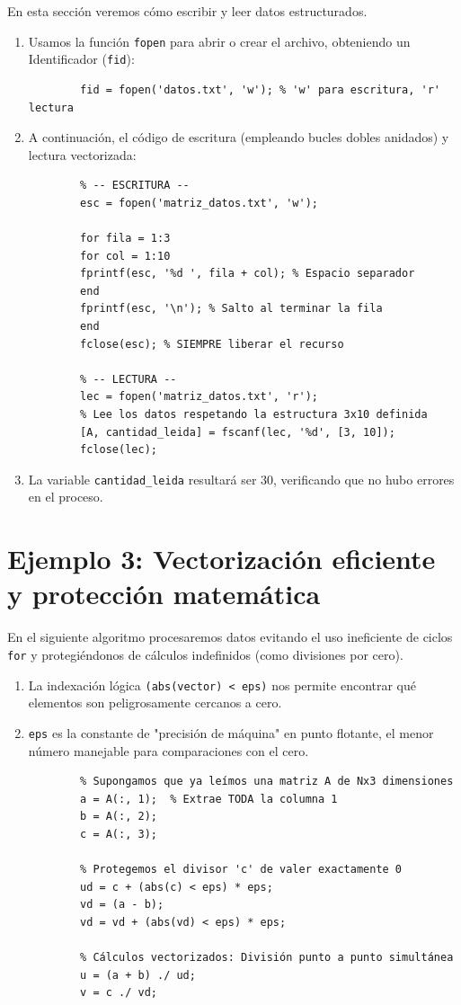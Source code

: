 \documentclass[11pt,a4paper,openany]{book}
\begin{document}
En esta sección veremos cómo escribir y leer datos estructurados.
\begin{enumerate}
	\item Usamos la función \texttt{fopen} para abrir o crear el archivo, obteniendo un Identificador (\texttt{fid}):
	\begin{verbatim}
		fid = fopen('datos.txt', 'w'); % 'w' para escritura, 'r' lectura
	\end{verbatim}
	
	\item A continuación, el código de escritura (empleando bucles dobles anidados) y lectura vectorizada:
	\begin{verbatim}
		% -- ESCRITURA --
		esc = fopen('matriz_datos.txt', 'w');
		
		for fila = 1:3
		for col = 1:10
		fprintf(esc, '%d ', fila + col); % Espacio separador
		end
		fprintf(esc, '\n'); % Salto al terminar la fila
		end
		fclose(esc); % SIEMPRE liberar el recurso
		
		% -- LECTURA --
		lec = fopen('matriz_datos.txt', 'r');
		% Lee los datos respetando la estructura 3x10 definida
		[A, cantidad_leida] = fscanf(lec, '%d', [3, 10]);
		fclose(lec);
	\end{verbatim}
	
	\item La variable \texttt{cantidad\_leida} resultará ser $30$, verificando que no hubo errores en el proceso.
\end{enumerate}

\section{Ejemplo 3: Vectorización eficiente y protección matemática}

En el siguiente algoritmo procesaremos datos evitando el uso ineficiente de ciclos \texttt{for} y protegiéndonos de cálculos indefinidos (como divisiones por cero).

\begin{enumerate}
	\item La indexación lógica \verb-(abs(vector) < eps)- nos permite encontrar qué elementos son peligrosamente cercanos a cero.
	\item \texttt{eps} es la constante de "precisión de máquina" en punto flotante, el menor número manejable para comparaciones con el cero.
	
	\begin{verbatim}
		% Supongamos que ya leímos una matriz A de Nx3 dimensiones
		a = A(:, 1);  % Extrae TODA la columna 1
		b = A(:, 2);
		c = A(:, 3);
		
		% Protegemos el divisor 'c' de valer exactamente 0
		ud = c + (abs(c) < eps) * eps; 
		vd = (a - b);
		vd = vd + (abs(vd) < eps) * eps;
		
		% Cálculos vectorizados: División punto a punto simultánea
		u = (a + b) ./ ud;  
		v = c ./ vd;        
	\end{verbatim}
\end{enumerate}
\end{document}
